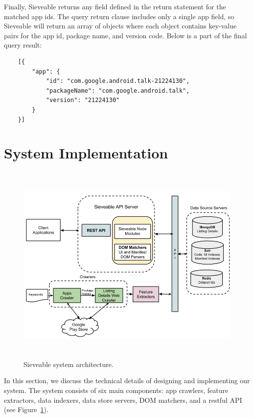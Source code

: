Finally, Sieveable returns any field defined in the return statement for the matched app ids.
The query return clause includes only a single app field, so Sieveable will return an array of objects where each object contains key-value pairs for the app id, package name, and version code. Below is a part of the final query result:
\begin{verbatim}
	[{
		"app": {
			"id": "com.google.android.talk-21224130",
			"packageName": "com.google.android.talk",
			"version": "21224130"
		}
	}]
\end{verbatim}

\section{System Implementation}
\begin{figure}[!t]
	\centering
	\includegraphics[width=17cm, height=10cm]{figures/sieveable-deep-search/architecture}
	\caption{Sieveable system architecture.}
	\label{fig:fig_architecture}
\end{figure}

In this section, we discuss the technical details of designing and implementing our system. The system consists of six main components: app crawlers, feature extractors, data indexers, data store servers, DOM matchers, and a restful API (see Figure~\ref{fig:fig_architecture}).

